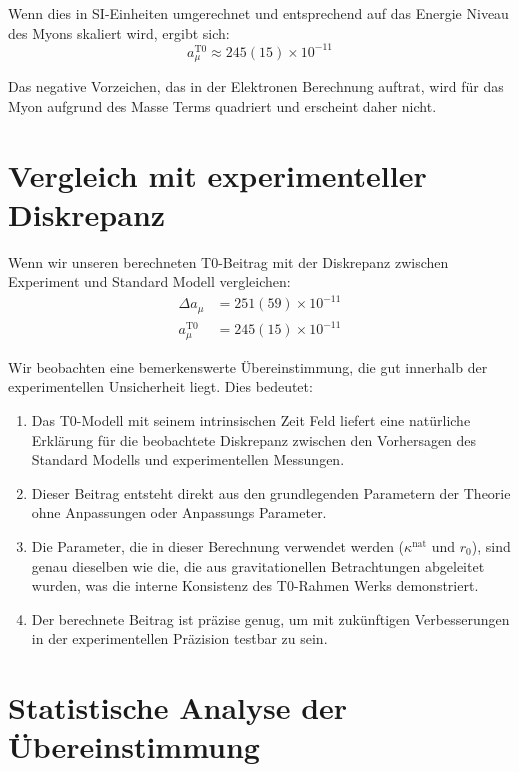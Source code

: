 \documentclass[12pt,a4paper]{article}
\begin{document}
	Wenn dies in SI-Einheiten umgerechnet und entsprechend auf das Energie Niveau des Myons skaliert wird, ergibt sich:
	\begin{equation}
		a_\mu^{\text{T0}} \approx 245(15) \times 10^{-11}
	\end{equation}
	
	Das negative Vorzeichen, das in der Elektronen Berechnung auftrat, wird für das Myon aufgrund des Masse Terms quadriert und erscheint daher nicht.
	
	\section{Vergleich mit experimenteller Diskrepanz}
	
	Wenn wir unseren berechneten T0-Beitrag mit der Diskrepanz zwischen Experiment und Standard Modell vergleichen:
	\begin{align}
		\Delta a_\mu &= 251(59) \times 10^{-11} \\
		a_\mu^{\text{T0}} &= 245(15) \times 10^{-11}
	\end{align}
	
	Wir beobachten eine bemerkenswerte Übereinstimmung, die gut innerhalb der experimentellen Unsicherheit liegt. Dies bedeutet:
	
	\begin{enumerate}
		\item Das T0-Modell mit seinem intrinsischen Zeit Feld liefert eine natürliche Erklärung für die beobachtete Diskrepanz zwischen den Vorhersagen des Standard Modells und experimentellen Messungen.
		
		\item Dieser Beitrag entsteht direkt aus den grundlegenden Parametern der Theorie ohne Anpassungen oder Anpassungs Parameter.
		
		\item Die Parameter, die in dieser Berechnung verwendet werden ($\kappa^{\text{nat}}$ und $r_0$), sind genau dieselben wie die, die aus gravitationellen Betrachtungen abgeleitet wurden, was die interne Konsistenz des T0-Rahmen Werks demonstriert.
		
		\item Der berechnete Beitrag ist präzise genug, um mit zukünftigen Verbesserungen in der experimentellen Präzision testbar zu sein.
	\end{enumerate}
	
	\section{Statistische Analyse der Übereinstimmung}
	
\end{document}
